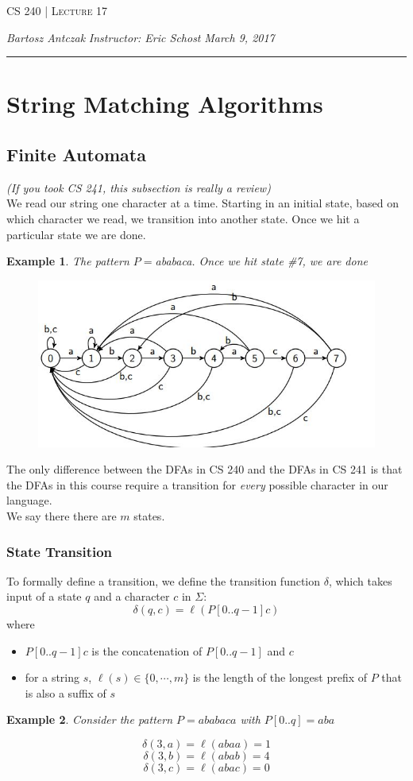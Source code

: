 \documentclass{report}
\newcommand{\lectureNum}{17}
\newcommand{\curDate}{March 9, 2017}
\newcommand{\course}{CS 240}
\newtheorem{ex}{Example}[section]
\begin{document}
\begin{center}
\begin{Large}
\textsc{\course{} | Lecture \lectureNum{}}
\end{Large}
\end{center} 
\noindent \textit{Bartosz Antczak} \hfill
\textit{Instructor: Eric Schost} \hfill
\textit{\curDate{}}
\rule{\textwidth}{0.4pt}

\section{String Matching Algorithms}
\subsection{Finite Automata}
\textit{(If you took CS 241, this subsection is really a review)}\\
We read our string one character at a time. Starting in an initial state, based on which character we read, we transition into another state. Once we hit a particular state we are done.
\begin{ex}
The pattern $P = $ababaca. Once we hit state \#7, we are done
\end{ex}
\begin{figure}[ht]
\includegraphics[scale=0.6]{fa.jpg}
\end{figure}
The only difference between the DFAs in CS 240 and the DFAs in CS 241 is that the DFAs in this course require a transition for \textit{every} possible character in our language.\\We say there there are $m$ states.
\subsubsection{State Transition}
To formally define a transition, we define the transition function $\delta$, which takes input of a state $q$ and a character $c$ in $\Sigma$:
$$\delta(q, c) = \ell(P[0..q-1]c)$$
where
\begin{itemize}
\item $P[0..q-1]c$ is the concatenation of $P[0..q-1]$ and $c$
\item for a string $s$, $\ell(s) \in \{0, \cdots, m\}$ is the length of the longest prefix of $P$ that is also a suffix of $s$
\end{itemize}
\begin{ex}
Consider the pattern $P = ababaca$ with $P[0..q] = aba$
\end{ex}
$$\delta(3, a) = \ell(abaa) = 1$$
$$\delta(3, b) = \ell(abab) = 4$$
$$\delta(3, c) = \ell(abac) = 0$$
\end{document}
